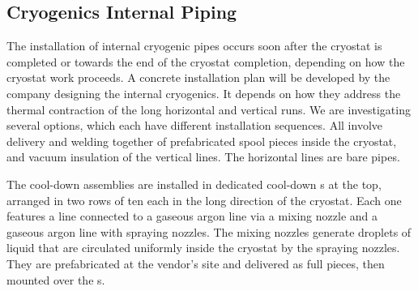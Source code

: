
\subsection{Cryogenics Internal Piping}
\label{sec:fdgen-slow-cryo-install-pipes}


The installation of internal cryogenic pipes occurs soon after the cryostat is completed or towards the end of the cryostat completion, depending on how the cryostat work proceeds. A concrete installation plan will be developed by the company designing the internal cryogenics. It depends on how they address the thermal contraction of the long horizontal and vertical runs. We are investigating several options, which each have different installation sequences. %
All involve delivery and welding together of prefabricated spool pieces inside the cryostat, and vacuum insulation of the vertical lines. The horizontal lines are bare pipes. 

The cool-down assemblies are installed in dedicated cool-down \fdth{}s at the top, arranged in
two rows of ten each in the long direction of the cryostat. Each one features a \lar line connected to a gaseous argon line via a mixing nozzle and a gaseous argon line with spraying nozzles. The mixing nozzles generate droplets of liquid that are circulated uniformly inside the cryostat by the spraying nozzles. They are prefabricated at the vendor's site and delivered as full pieces, %
then mounted over the \fdth{}s.

